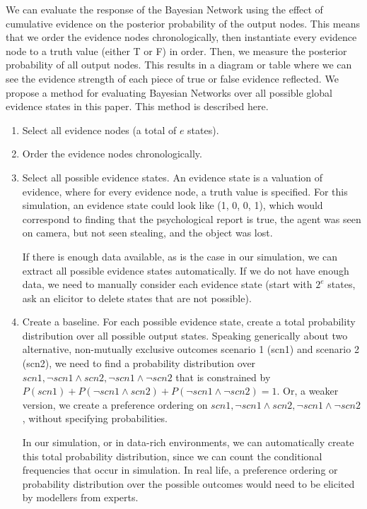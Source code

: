 \documentclass[12pt]{article}
\begin{document}
We can evaluate the response of the Bayesian Network using the effect of cumulative evidence on the posterior probability of the output nodes. This means that we order the evidence nodes chronologically, then instantiate every evidence node to a truth value (either T or F) in order. Then, we measure the posterior probability of all output nodes. This results in a diagram or table where we can see the evidence strength of each piece of true or false evidence reflected. We propose a method for evaluating Bayesian Networks over all possible global evidence states in this paper. This method is described here.

\begin{enumerate}
\item Select all evidence nodes (a total of $e$ states).
\item Order the evidence nodes chronologically.
\item Select all possible evidence states. An evidence state is a valuation of evidence, where for every evidence node, a truth value is specified. For this simulation, an evidence state could look like (1, 0, 0, 1), which would correspond to finding that the psychological report is true, the agent was seen on camera, but not seen stealing, and the object was lost.

If there is enough data available, as is the case in our simulation, we can extract all possible evidence states automatically. If we do not have enough data, we need to manually consider each evidence state (start with $2^e$ states, ask an elicitor to delete states that are not possible).
\item Create a baseline. For each possible evidence state, create a total probability distribution over all possible output states. Speaking generically about two alternative, non-mutually exclusive outcomes scenario 1 (scn1) and scenario 2 (scn2), we need to find a probability distribution over $scn1, \neg scn1 \land scn2, \neg scn1 \land \neg scn2$ that is constrained by $P(scn1) + P(\neg scn1 \land scn2) + P(\neg scn1 \land \neg scn2) = 1$. Or, a weaker version, we create a preference ordering on $scn1, \neg scn1 \land scn2, \neg scn1 \land \neg scn2$, without specifying probabilities. 

In our simulation, or in data-rich environments, we can automatically create this total probability distribution, since we can count the conditional frequencies that occur in simulation. In real life, a preference ordering or probability distribution over the possible outcomes would need to be elicited by modellers from experts.


\end{enumerate}
\end{document}
